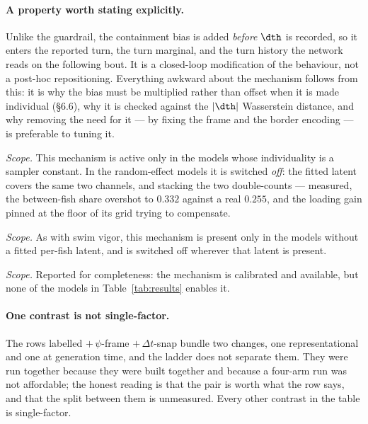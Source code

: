 \paragraph{A property worth stating explicitly.} Unlike the guardrail, the containment bias is
added \emph{before} $\dth$ is recorded, so it enters the reported turn, the turn marginal, and the
turn history the network reads on the following bout. It is a closed-loop modification of the
behaviour, not a post-hoc repositioning. Everything awkward about the mechanism follows from this:
it is why the bias must be multiplied rather than offset when it is made individual (\S6.6), why it
is checked against the $|\dth|$ Wasserstein distance, and why removing the need for it --- by fixing
the frame and the border encoding --- is preferable to tuning it.



\medskip\noindent\emph{Scope.} This mechanism is active only in the models whose individuality is a
sampler constant. In the random-effect models it is switched \emph{off}: the fitted latent covers
the same two channels, and stacking the two double-counts --- measured, the between-fish share
overshot to $0.332$ against a real $0.255$, and the loading gain pinned at the floor of its grid
trying to compensate.

\medskip\noindent\emph{Scope.} As with swim vigor, this mechanism is present only in the models
without a fitted per-fish latent, and is switched off wherever that latent is present.

\medskip\noindent\emph{Scope.} Reported for completeness: the mechanism is calibrated and available,
but none of the models in Table~\ref{tab:results} enables it.



\paragraph{One contrast is not single-factor.} The rows labelled $+\,\psi$-frame $+\,\Delta t$-snap
bundle two changes, one representational and one at generation time, and the ladder does not
separate them. They were run together because they were built together and because a four-arm run
was not affordable; the honest reading is that the pair is worth what the row says, and that the
split between them is unmeasured. Every other contrast in the table is single-factor.
